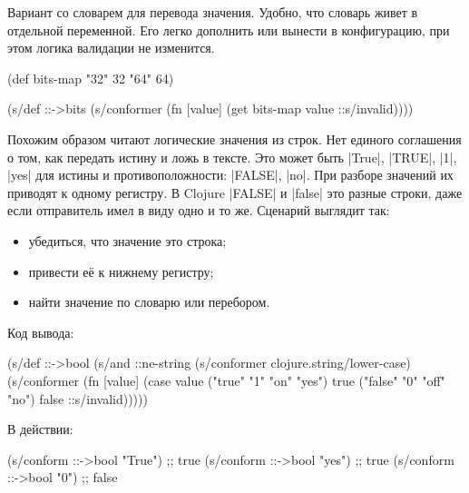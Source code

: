 
Вариант со словарем для перевода значения. Удобно, что словарь живет в отдельной
переменной. Его легко дополнить или вынести в конфигурацию, при этом логика
валидации не изменится.

\begin{english}
  \begin{clojure}
(def bits-map {"32" 32 "64" 64})

(s/def ::->bits
  (s/conformer
   (fn [value]
     (get bits-map value ::s/invalid))))
  \end{clojure}
\end{english}


Похожим образом читают логические значения из строк. Нет единого соглашения о
том, как передать истину и ложь в тексте. Это может быть \spverb|True|,
\spverb|TRUE|, \spverb|1|, \spverb|yes| для истины и противоположности:
\spverb|FALSE|, \spverb|no|. При разборе значений их приводят к одному
регистру. В Clojure \spverb|FALSE| и \spverb|false| это разные строки, даже если
отправитель имел в виду одно и то же. Сценарий выглядит так:

\begin{itemize}

\item
  убедиться, что значение это строка;

\item
  привести е\"{е} к нижнему регистру;

\item
  найти значение по словарю или перебором.

\end{itemize}

\noindent
Код вывода:

\begin{english}
  \begin{clojure}
(s/def ::->bool
  (s/and
   ::ne-string
   (s/conformer clojure.string/lower-case)
   (s/conformer
    (fn [value]
      (case value
        ("true" "1" "on" "yes") true
        ("false" "0" "off" "no") false
        ::s/invalid)))))

  \end{clojure}
\end{english}

\noindent
В действии:

\begin{english}
  \begin{clojure}
(s/conform ::->bool "True") ;; true
(s/conform ::->bool "yes")  ;; true
(s/conform ::->bool "0")    ;; false
  \end{clojure}
\end{english}

